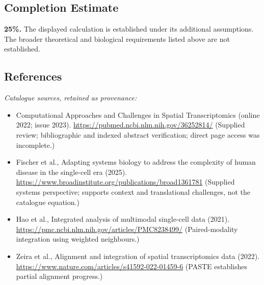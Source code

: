\documentclass[11pt]{article}
\begin{document}
\subsection{Completion Estimate}
\textbf{25\%.} The displayed calculation is established under its additional assumptions. The broader theoretical and biological requirements listed above are not established.
\subsection{References}
\noindent\emph{Catalogue sources, retained as provenance:}
\begin{itemize}
\item Computational Approaches and Challenges in Spatial Transcriptomics (online 2022; issue 2023). \url{https://pubmed.ncbi.nlm.nih.gov/36252814/} (Supplied review; bibliographic and indexed abstract verification; direct page access was incomplete.)
\item Fischer et al., Adapting systems biology to address the complexity of human disease in the single-cell era (2025). \url{https://www.broadinstitute.org/publications/broad1361781} (Supplied systems perspective; supports context and translational challenges, not the catalogue equation.)
\item Hao et al., Integrated analysis of multimodal single-cell data (2021). \url{https://pmc.ncbi.nlm.nih.gov/articles/PMC8238499/} (Paired-modality integration using weighted neighbours.)
\item Zeira et al., Alignment and integration of spatial transcriptomics data (2022). \url{https://www.nature.com/articles/s41592-022-01459-6} (PASTE establishes partial alignment progress.)
\end{itemize}
\clearpage


\appendix
\end{document}
